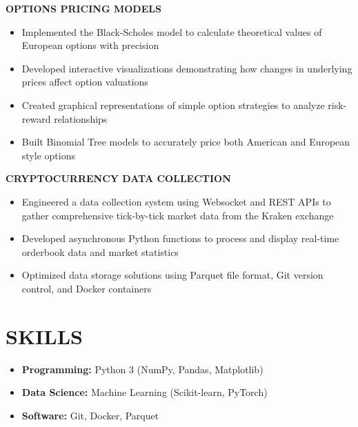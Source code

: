 \documentclass[10pt,letterpaper]{article}
\begin{document}
\begin{flushleft}
\textbf{\color{subheadingcolor}OPTIONS PRICING MODELS}
\begin{itemize}[leftmargin=*,nosep,itemsep=2pt]
    \item Implemented the Black-Scholes model to calculate theoretical values of European options with precision
    \item Developed interactive visualizations demonstrating how changes in underlying prices affect option valuations
    \item Created graphical representations of simple option strategies to analyze risk-reward relationships
    \item Built Binomial Tree models to accurately price both American and European style options
\end{itemize}
\end{flushleft}

\begin{flushleft}
\textbf{\color{subheadingcolor}CRYPTOCURRENCY DATA COLLECTION}
\begin{itemize}[leftmargin=*,nosep,itemsep=2pt]
    \item Engineered a data collection system using Websocket and REST APIs to gather comprehensive tick-by-tick market data from the Kraken exchange
    \item Developed asynchronous Python functions to process and display real-time orderbook data and market statistics
    \item Optimized data storage solutions using Parquet file format, Git version control, and Docker containers
\end{itemize}
\end{flushleft}

\vspace{0.5em}
\section{SKILLS}
\vspace{0.5em}
\begin{minipage}[t]{0.48\textwidth}
\begin{itemize}[leftmargin=*,nosep,itemsep=2pt]
  \item \textbf{Programming:} Python 3 (NumPy, Pandas, Matplotlib)
  \item \textbf{Data Science:} Machine Learning (Scikit-learn, PyTorch)
\end{itemize}
\end{minipage}
\hfill
\begin{minipage}[t]{0.48\textwidth}
\begin{itemize}[leftmargin=*,nosep,itemsep=2pt]
  \item \textbf{Software:} Git, Docker, Parquet  
\end{itemize}
\end{minipage}
\end{document}
